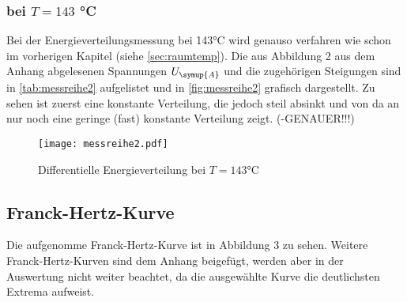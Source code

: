         \subsubsection{bei $T = 143$ °C}
        Bei der Energieverteilungsmessung bei 143°C wird genauso verfahren wie schon im vorherigen Kapitel (siehe \autoref{sec:raumtemp}).
        Die aus Abbildung 2 aus dem Anhang abgelesenen Spannungen $U_{\symup{A}}$ und die zugehörigen Steigungen sind in \autoref{tab:messreihe2} aufgelistet
        und in \autoref{fig:messreihe2} grafisch dargestellt. Zu sehen ist zuerst eine konstante Verteilung, die jedoch steil absinkt und von da an nur noch eine
        geringe (fast) konstante Verteilung zeigt. (-GENAUER!!!)
        
         \begin{figure}
          \centering
          \texttt{[image: messreihe2.pdf]}
          \caption{Differentielle Energieverteilung bei $T = 143$°C}
          \label{fig:messreihe2}
        \end{figure}
    \subsection{Franck-Hertz-Kurve} 
    Die aufgenomme Franck-Hertz-Kurve ist in Abbildung 3 zu sehen. Weitere Franck-Hertz-Kurven sind dem Anhang beigefügt, werden aber in der Auswertung nicht 
    weiter beachtet, da die ausgewählte Kurve die deutlichsten Extrema aufweist.   